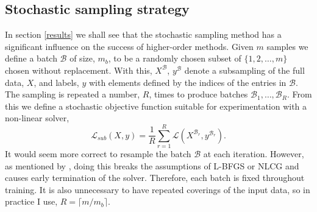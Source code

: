 \documentclass[nohyperref]{article}
\theoremstyle{plain}
\theoremstyle{definition}
\theoremstyle{remark}
\begin{document}
\subsection{Stochastic sampling strategy}\label{stoch_strategy}
In section \ref{results} we shall see that the stochastic sampling method has a significant influence on the success of higher-order methods. Given $m$ samples we define a batch $\mathcal{B}$ of size, $m_b$, to be a randomly chosen subset of $\{1,2,\ldots,m\}$ chosen without replacement. With this, $X^\mathcal{B}$, $y^\mathcal{B}$ denote a subsampling of the full data, $X$, and labels, $y$ with elements defined by the indices of the entries in  $\mathcal{B}$. The sampling is repeated a number, $R$, times to produce batches  $\mathcal{B}_1, \ldots, \mathcal{B}_R$. From this we define a stochastic objective function suitable for experimentation with a non-linear solver,
\begin{equation}
\mathcal{L}_{sub}(X,y)=\frac{1}{R}\sum_{r=1}^R \mathcal{L}(X^{\mathcal{B}_r}, y^{\mathcal{B}_r}).\label{stoch_resample}
\end{equation}
It would seem more correct to resample the batch $\mathcal{B}$ at each iteration. However, as mentioned by \citet{Martens:Deep}, doing this breaks the assumptions of L-BFGS or NLCG and causes early termination of the solver. Therefore, each batch is fixed throughout training. It is also unnecessary to have repeated coverings of the input data, so in practice I use, $R=\lceil m/m_b \rceil$.

\end{document}
